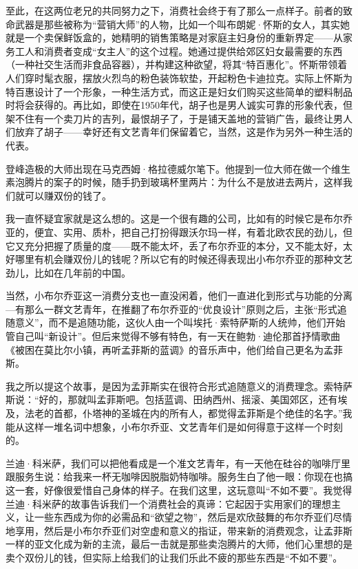 至此，在这两位老兄的共同努力之下，消费社会终于有了那么一点样子。前者的致命武器是那些被称为``营销大师''的人物，比如一个叫布朗妮·怀斯的女人，其实她就是一个卖保鲜饭盒的，她精明的销售策略是对家庭主妇身份的重新界定------从家务工人和消费者变成``女主人''的这个过程。她通过提供给郊区妇女最需要的东西（一种社交生活而非食品容器），并构建这种欲望，将其``特百惠化''。怀斯带领着人们穿时髦衣服，摆放火烈鸟的粉色装饰软垫，开起粉色卡迪拉克。实际上怀斯为特百惠设计了一个形象，一种生活方式，而这正是妇女们购买这些简单的塑料制品时将会获得的。再比如，即使在1950年代，胡子也是男人诚实可靠的形象代表，但架不住有一个卖刀片的吉列，最恨胡子了，于是铺天盖地的营销广告，最终让男人们放弃了胡子------幸好还有文艺青年们保留着它，当然，这是作为另外一种生活的代表。

登峰造极的大师出现在马克西姆·格拉德威尔笔下。他提到一位大师在做一个维生素泡腾片的案子的时候，随手扔到玻璃杯里两片：为什么不是放进去两片，这样我们就可以赚双份的钱了。

我一直怀疑宜家就是这么想的。这是一个很有趣的公司，比如有的时候它是布尔乔亚的，便宜、实用、质朴，把自己打扮得跟沃尔玛一样，有着北欧农民的劲儿，但它又充分把握了质量的度------既不能太坏，丢了布尔乔亚的本分，又不能太好，太好哪里有机会赚双份儿的钱呢？所以它有的时候还得表现出小布尔乔亚的那种文艺劲儿，比如在几年前的中国。

当然，小布尔乔亚这一消费分支也一直没闲着，他们一直进化到形式与功能的分离---有那么一群文艺青年，在推翻了布尔乔亚的``优良设计''原则之后，主张``形式追随意义''，而不是追随功能，这伙人由一个叫埃托·索特萨斯的人统帅，他们开始管自己叫``新设计''。但后来觉得不够有特色，有一天在鲍勃·迪伦那首抒情歌曲《被困在莫比尔小镇，再听孟菲斯的蓝调》的音乐声中，他们给自己更名为孟菲斯。

我之所以提这个故事，是因为孟菲斯实在很符合形式追随意义的消费理念。索特萨斯说：``好的，那就叫孟菲斯吧。包括蓝调、田纳西州、摇滚、美国郊区，还有埃及，法老的首都，仆塔神的圣城在内的所有人，都觉得孟菲斯是个绝佳的名字。''我能从这样一堆名词中想象，小布尔乔亚、文艺青年们是如何得意于这样一个时刻的。

兰迪·科米萨，我们可以把他看成是一个准文艺青年，有一天他在硅谷的咖啡厅里跟服务生说：给我来一杯无咖啡因脱脂奶特咖啡。服务生白了他一眼：你现在也搞这一套，好像很爱惜自己身体的样子。在我们这里，这玩意叫``不如不要''。我觉得兰迪·科米萨的故事告诉我们一个消费社会的真谛：它起因于实用家们的理想主义，让一些东西成为你的必需品和``欲望之物''，然后是欢欣鼓舞的布尔乔亚们尽情地享用，然后是小布尔乔亚们对空虚和意义的指证，带来新的消费观念，让孟菲斯一样的亚文化成为新的主流，最后一击就是那些卖泡腾片的大师，他们心里想的是卖个双份儿的钱，但实际上给我们的让我们乐此不疲的那些东西是``不如不要''。

